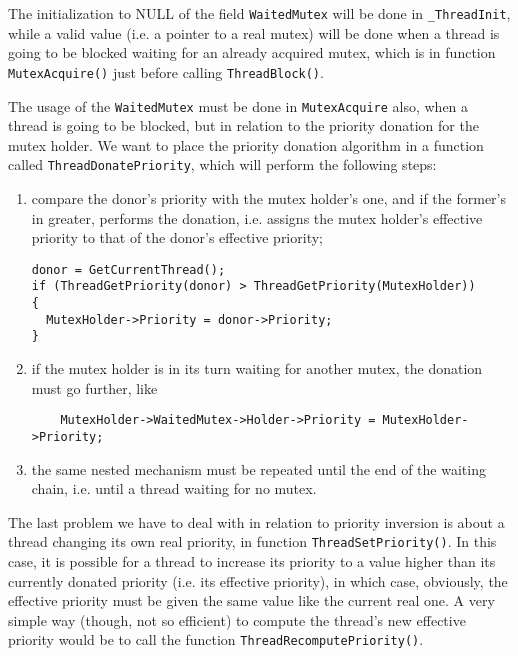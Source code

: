 The initialization to NULL of the field \lstinline|WaitedMutex| will be done in \lstinline|_ThreadInit|, while a valid value (i.e. a pointer to a real mutex) will be done when a thread is going to be blocked waiting for an already acquired mutex, which is in function \lstinline|MutexAcquire()| just before calling \lstinline|ThreadBlock()|.

The usage of the \lstinline|WaitedMutex| must be done in \lstinline|MutexAcquire| also, when a thread is going to be blocked, but in relation to the priority donation for the mutex holder. We want to place the priority donation algorithm in a function called \lstinline|ThreadDonatePriority|, which will perform the following steps:
\begin{enumerate}
    \item compare the donor's priority with the mutex holder's one, and if the former's in greater, performs the donation, i.e. assigns the mutex holder's effective priority to that of the donor's effective priority;
    \begin{lstlisting}
donor = GetCurrentThread();
if (ThreadGetPriority(donor) > ThreadGetPriority(MutexHolder))
{
  MutexHolder->Priority = donor->Priority;
}
    \end{lstlisting}

    \item if the mutex holder is in its turn waiting for another mutex, the donation must go further, like
\begin{lstlisting}
    MutexHolder->WaitedMutex->Holder->Priority = MutexHolder->Priority;
\end{lstlisting}

    \item the same nested mechanism must be repeated until the end of the waiting chain, i.e. until a thread waiting for no mutex.
\end{enumerate}

The last problem we have to deal with in relation to priority inversion is about a thread changing its own real priority, in function \lstinline|ThreadSetPriority()|. In this case, it is possible for a thread to increase its priority to a value higher than its currently donated priority (i.e. its effective priority), in which case, obviously, the effective priority must be given the same value like the current real one. A very simple way (though, not so efficient) to compute the thread's new effective priority would be to call the function \lstinline|ThreadRecomputePriority()|.


